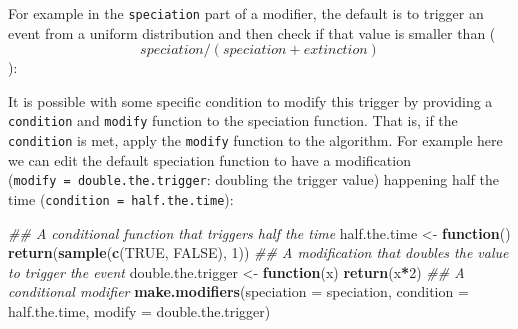\documentclass[
]{book}
\newenvironment{Shaded}{\begin{snugshade}}{\end{snugshade}}
\newcommand{\CommentTok}[1]{\textcolor[rgb]{0.56,0.35,0.01}{\textit{#1}}}
\newcommand{\ControlFlowTok}[1]{\textcolor[rgb]{0.13,0.29,0.53}{\textbf{#1}}}
\newcommand{\DataTypeTok}[1]{\textcolor[rgb]{0.13,0.29,0.53}{#1}}
\newcommand{\DecValTok}[1]{\textcolor[rgb]{0.00,0.00,0.81}{#1}}
\newcommand{\KeywordTok}[1]{\textcolor[rgb]{0.13,0.29,0.53}{\textbf{#1}}}
\newcommand{\NormalTok}[1]{#1}
\newcommand{\OperatorTok}[1]{\textcolor[rgb]{0.81,0.36,0.00}{\textbf{#1}}}
\newcommand{\OtherTok}[1]{\textcolor[rgb]{0.56,0.35,0.01}{#1}}
\newcommand{\StringTok}[1]{\textcolor[rgb]{0.31,0.60,0.02}{#1}}
\begin{document}
For example in the \texttt{speciation} part of a modifier, the default is to trigger an event from a uniform distribution and then check if that value is smaller than (\[speciation/(speciation + extinction)\]):

\begin{Shaded}
\end{Shaded}

It is possible with some specific condition to modify this trigger by providing a \texttt{condition} and \texttt{modify} function to the speciation function.
That is, if the \texttt{condition} is met, apply the \texttt{modify} function to the algorithm.
For example here we can edit the default speciation function to have a modification (\texttt{modify\ =\ double.the.trigger}: doubling the trigger value) happening half the time (\texttt{condition\ =\ half.the.time}):

\begin{Shaded}
\begin{Highlighting}[]
\CommentTok{\#\# A conditional function that triggers half the time}
\NormalTok{half.the.time \textless{}{-}}\StringTok{ }\ControlFlowTok{function}\NormalTok{() }\KeywordTok{return}\NormalTok{(}\KeywordTok{sample}\NormalTok{(}\KeywordTok{c}\NormalTok{(}\OtherTok{TRUE}\NormalTok{, }\OtherTok{FALSE}\NormalTok{), }\DecValTok{1}\NormalTok{))}
\CommentTok{\#\# A modification that doubles the value to trigger the event}
\NormalTok{double.the.trigger \textless{}{-}}\StringTok{ }\ControlFlowTok{function}\NormalTok{(x) }\KeywordTok{return}\NormalTok{(x}\OperatorTok{*}\DecValTok{2}\NormalTok{)}
\CommentTok{\#\# A conditional modifier}
\KeywordTok{make.modifiers}\NormalTok{(}\DataTypeTok{speciation =}\NormalTok{ speciation,}
               \DataTypeTok{condition  =}\NormalTok{ half.the.time, }
               \DataTypeTok{modify     =}\NormalTok{ double.the.trigger)}
\end{Highlighting}
\end{Shaded}
\end{document}
